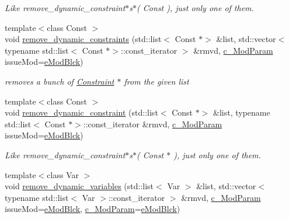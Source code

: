 \begin{Indent}
\begin{DoxyCompactItemize}
\begin{DoxyCompactList}\small\item\em Like remove\+\_\+dynamic\+\_\+constraint$\ast$s$\ast$( Const ), just only one of them. \end{DoxyCompactList}\item 
{\footnotesize template$<$class Const $>$ }\\void \mbox{\hyperlink{class_s_m_spp__di__unipi__it_1_1_block_acd2feed47c85ecb4cbd6cc4b3f6bbf58}{remove\+\_\+dynamic\+\_\+constraints}} (std\+::list$<$ Const $\ast$$>$ \&list, std\+::vector$<$ typename std\+::list$<$ Const $\ast$$>$\+::const\+\_\+iterator $>$ \&rmvd, \mbox{\hyperlink{group___modification___t_y_p_e_s_ga544246d8c462e9a2d817c2c30797968f}{c\+\_\+\+Mod\+Param}} issue\+Mod=\mbox{\hyperlink{group___modification___t_y_p_e_s_gga48fddcdd03a03f49b7e389ca1ed938d4a21b14b26b1c0093a0905f6fc010bad29}{e\+Mod\+Blck}})
\begin{DoxyCompactList}\small\item\em removes a bunch of \mbox{\hyperlink{class_s_m_spp__di__unipi__it_1_1_constraint}{Constraint}} $\ast$ from the given list \end{DoxyCompactList}\item 
\mbox{\label{class_s_m_spp__di__unipi__it_1_1_block_a60155859b0e972a98eec773e81bfde13}} 
{\footnotesize template$<$class Const $>$ }\\void \mbox{\hyperlink{class_s_m_spp__di__unipi__it_1_1_block_a60155859b0e972a98eec773e81bfde13}{remove\+\_\+dynamic\+\_\+constraint}} (std\+::list$<$ Const $\ast$$>$ \&list, typename std\+::list$<$ Const $\ast$$>$\+::const\+\_\+iterator \&rmvd, \mbox{\hyperlink{group___modification___t_y_p_e_s_ga544246d8c462e9a2d817c2c30797968f}{c\+\_\+\+Mod\+Param}} issue\+Mod=\mbox{\hyperlink{group___modification___t_y_p_e_s_gga48fddcdd03a03f49b7e389ca1ed938d4a21b14b26b1c0093a0905f6fc010bad29}{e\+Mod\+Blck}})
\begin{DoxyCompactList}\small\item\em Like remove\+\_\+dynamic\+\_\+constraint$\ast$s$\ast$( Const $\ast$ ), just only one of them. \end{DoxyCompactList}\item 
{\footnotesize template$<$class Var $>$ }\\void \mbox{\hyperlink{class_s_m_spp__di__unipi__it_1_1_block_a1c7a7f0599403293cdb7cecd381329e3}{remove\+\_\+dynamic\+\_\+variables}} (std\+::list$<$ Var $>$ \&list, std\+::vector$<$ typename std\+::list$<$ Var $>$\+::const\+\_\+iterator $>$ \&rmvd, \mbox{\hyperlink{group___modification___t_y_p_e_s_ga544246d8c462e9a2d817c2c30797968f}{c\+\_\+\+Mod\+Param}} issue\+Mod=\mbox{\hyperlink{group___modification___t_y_p_e_s_gga48fddcdd03a03f49b7e389ca1ed938d4a21b14b26b1c0093a0905f6fc010bad29}{e\+Mod\+Blck}}, \mbox{\hyperlink{group___modification___t_y_p_e_s_ga544246d8c462e9a2d817c2c30797968f}{c\+\_\+\+Mod\+Param}}=\mbox{\hyperlink{group___modification___t_y_p_e_s_gga48fddcdd03a03f49b7e389ca1ed938d4a21b14b26b1c0093a0905f6fc010bad29}{e\+Mod\+Blck}})

\end{DoxyCompactItemize}
\end{Indent}
